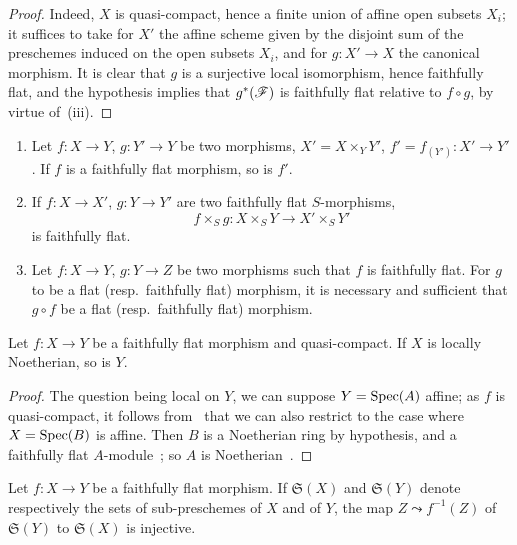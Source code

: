 \begin{proof}
Indeed, $X$ is quasi-compact, hence a finite union of affine open subsets $X_i$; it suffices to take for $X'$ the affine scheme given by the disjoint sum of the preschemes induced on the open subsets $X_i$, and for $g:X'\to X$ the canonical morphism.
It is clear that $g$ is a surjective local isomorphism, hence faithfully flat, and the hypothesis implies that $g^*(\mathscr{F})$ is faithfully flat relative to $f\circ g$, by virtue of~\textnormal{(iii)}.
\end{proof}

\begin{corollary}[2.2.13]
\label{IV.2.2.13}
\medskip\noindent
\begin{enumerate}
  \item[\textnormal{(i)}] Let $f:X\to Y$, $g:Y'\to Y$ be two morphisms, $X'=X\times_Y Y'$, $f'=f_{(Y')}:X'\to Y'$.
    If $f$ is a faithfully flat morphism, so is $f'$.
  \item[\textnormal{(ii)}] If $f:X\to X'$, $g:Y\to Y'$ are two faithfully flat $S$-morphisms,
    \[
      f\times_S g: X\times_S Y \to X'\times_S Y'
    \]
    is faithfully flat.
  \item[\textnormal{(iii)}] Let $f:X\to Y$, $g:Y\to Z$ be two morphisms such that $f$ is faithfully flat.
    For $g$ to be a flat \textnormal{(resp.}\ faithfully flat\textnormal{)} morphism, it is necessary and sufficient that $g\circ f$ be a flat \textnormal{(resp.}\ faithfully flat\textnormal{)} morphism.
\end{enumerate}
\end{corollary}

\begin{proposition}[2.2.14]
\label{IV.2.2.14}
Let $f:X\to Y$ be a faithfully flat morphism and quasi-compact.
If $X$ is locally Noetherian, so is $Y$.
\end{proposition}

\begin{proof}
The question being local on $Y$, we can suppose $Y=\operatorname{Spec}(A)$ affine; as $f$ is quasi-compact, it follows from~ that we can also restrict to the case where $X=\operatorname{Spec}(B)$ is affine.
Then $B$ is a Noetherian ring by hypothesis, and a faithfully flat $A$-module~; so $A$ is Noetherian~.
\end{proof}

\begin{proposition}[2.2.15]
\label{IV.2.2.15}
Let $f:X\to Y$ be a faithfully flat morphism.
If $\mathfrak{S}(X)$ and $\mathfrak{S}(Y)$ denote respectively the sets of sub-preschemes of $X$ and of $Y$, the map $Z\leadsto f^{-1}(Z)$ of $\mathfrak{S}(Y)$ to $\mathfrak{S}(X)$ is injective.
\end{proposition}

